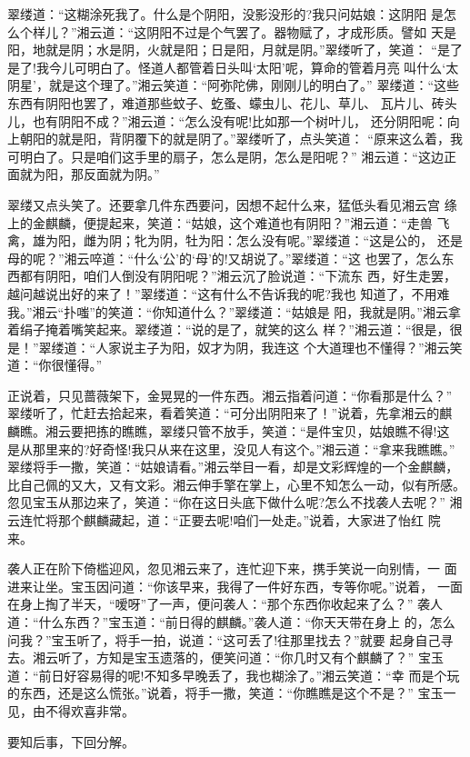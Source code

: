 翠缕道：“这糊涂死我了。什么是个阴阳，没影没形的?我只问姑娘：这阴阳
是怎么个样儿？”湘云道：“这阴阳不过是个气罢了。器物赋了，才成形质。譬如
天是阳，地就是阴；水是阴，火就是阳；日是阳，月就是阴。”翠缕听了，笑道：
“是了是了!我今儿可明白了。怪道人都管着日头叫‘太阳’呢，算命的管着月亮
叫什么‘太阴星’，就是这个理了。”湘云笑道：“阿弥陀佛，刚刚儿的明白了。”
翠缕道：“这些东西有阴阳也罢了，难道那些蚊子、虼蚤、蠓虫儿、花儿、草儿、
瓦片儿、砖头儿，也有阴阳不成？”湘云道：“怎么没有呢!比如那一个树叶儿，
还分阴阳呢：向上朝阳的就是阳，背阴覆下的就是阴了。”翠缕听了，点头笑道：
“原来这么着，我可明白了。只是咱们这手里的扇子，怎么是阴，怎么是阳呢？”
湘云道：“这边正面就为阳，那反面就为阴。”

翠缕又点头笑了。还要拿几件东西要问，因想不起什么来，猛低头看见湘云宫
绦上的金麒麟，便提起来，笑道：“姑娘，这个难道也有阴阳？”湘云道：“走兽
飞禽，雄为阳，雌为阴；牝为阴，牡为阳：怎么没有呢。”翠缕道：“这是公的，
还是母的呢？”湘云啐道：“什么‘公’的‘母’的!又胡说了。”翠缕道：“这
也罢了，怎么东西都有阴阳，咱们人倒没有阴阳呢？”湘云沉了脸说道：“下流东
西，好生走罢，越问越说出好的来了！”翠缕道：“这有什么不告诉我的呢?我也
知道了，不用难我。”湘云“扑嗤”的笑道：“你知道什么？”翠缕道：“姑娘是
阳，我就是阴。”湘云拿着绢子掩着嘴笑起来。翠缕道：“说的是了，就笑的这么
样？”湘云道：“很是，很是！”翠缕道：“人家说主子为阳，奴才为阴，我连这
个大道理也不懂得？”湘云笑道：“你很懂得。”

正说着，只见蔷薇架下，金晃晃的一件东西。湘云指着问道：“你看那是什么？”
翠缕听了，忙赶去拾起来，看着笑道：“可分出阴阳来了！”说着，先拿湘云的麒
麟瞧。湘云要把拣的瞧瞧，翠缕只管不放手，笑道：“是件宝贝，姑娘瞧不得!这
是从那里来的?好奇怪!我只从来在这里，没见人有这个。”湘云道：“拿来我瞧瞧。”
翠缕将手一撒，笑道：“姑娘请看。”湘云举目一看，却是文彩辉煌的一个金麒麟，
比自己佩的又大，又有文彩。湘云伸手擎在掌上，心里不知怎么一动，似有所感。
忽见宝玉从那边来了，笑道：“你在这日头底下做什么呢?怎么不找袭人去呢？”
湘云连忙将那个麒麟藏起，道：“正要去呢!咱们一处走。”说着，大家进了怡红
院来。

袭人正在阶下倚槛迎风，忽见湘云来了，连忙迎下来，携手笑说一向别情，一
面进来让坐。宝玉因问道：“你该早来，我得了一件好东西，专等你呢。”说着，
一面在身上掏了半天，“嗳呀”了一声，便问袭人：“那个东西你收起来了么？”
袭人道：“什么东西？”宝玉道：“前日得的麒麟。”袭人道：“你天天带在身上
的，怎么问我？”宝玉听了，将手一拍，说道：“这可丢了!往那里找去？”就要
起身自己寻去。湘云听了，方知是宝玉遗落的，便笑问道：“你几时又有个麒麟了？”
宝玉道：“前日好容易得的呢!不知多早晚丢了，我也糊涂了。”湘云笑道：“幸
而是个玩的东西，还是这么慌张。”说着，将手一撒，笑道：“你瞧瞧是这个不是？”
宝玉一见，由不得欢喜非常。

要知后事，下回分解。